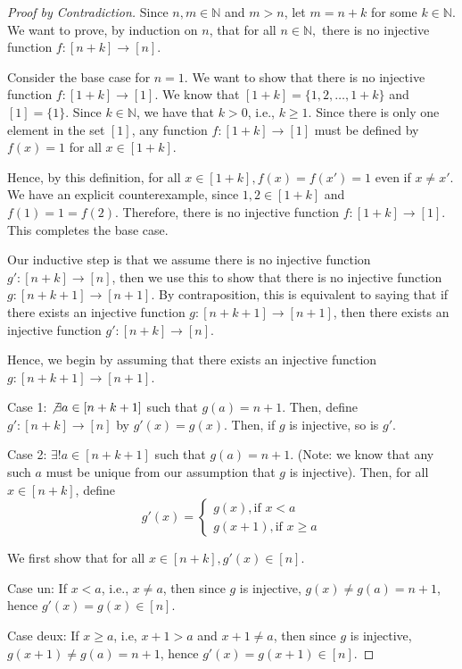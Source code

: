 \documentclass[11pt]{article}
\newcommand{\bbN}{\mathbb{N}}
\theoremstyle{definition}
\numberwithin{equation}{subsection}
\begin{document}
\begin{proof}[Proof by Contradiction]
Since $n, m \in \bbN$ and $m>n$, let $m=n+k$ for some $k \in \bbN$. We want to prove, by induction on $n$, that for all $n\in\mathbb{N},$ there is no injective function $f:[n+k]\rightarrow [n].$

Consider the base case for $n=1$. We want to show that there is no injective function $f:[1+k]\rightarrow [1].$ We know that $[1+k] = \{1, 2, \dots, 1+k\}$ and $[1] = \{1\}$. Since $k \in \bbN$, we have that $k>0$, i.e., $k \geq 1$. Since there is only one element in the set $[1]$, any function $f\colon [1+k] \rightarrow [1]$ must be defined by $f(x)=1$ for all $x \in [1+k]$. 

Hence, by this definition, for all $x \in [1+k], f(x)=f(x')=1$ even if $x \not = x'$. We have an explicit counterexample, since $1,2 \in [1+k]$ and $f(1)=1=f(2)$. Therefore, there is no injective function $f:[1+k]\rightarrow [1].$ This completes the base case.

Our inductive step is that we assume there is no injective function $g':[n+k]\rightarrow [n]$, then we use this to show that there is no injective function $g:[n+k+1]\rightarrow [n+1].$ By contraposition, this is equivalent to saying that if there exists an injective function $g:[n+k+1]\rightarrow [n+1]$, then there exists an injective function $g':[n+k]\rightarrow [n].$ 

Hence, we begin by assuming that there exists an injective function $g:[n+k+1]\rightarrow [n+1]$.

Case 1: $\not \exists a \in [n+k+1]$ such that $g(a)=n+1$. Then, define $g'\colon [n+k] \rightarrow [n]$ by $g'(x)=g(x)$. Then, if $g$ is injective, so is $g'$.

Case 2: $\exists! a \in [n+k+1]$ such that $g(a)=n+1$. (Note: we know that any such $a$ must be unique from our assumption that $g$ is injective). Then, for all $x \in [n+k]$, define 
\[
g'(x) =
\begin{cases}
g(x), \text{if } x < a \\
g(x+1), \text{if } x \geq a
\end{cases}
\]

We first show that for all $x \in [n+k], g'(x) \in [n]$. 

Case un: If $x < a$, i.e., $x \not= a$, then since $g$ is injective, $g(x) \not= g(a) = n+1$, hence $g'(x)=g(x) \in [n]$. 

Case deux: If $x \geq a$, i.e, $x+1 > a$ and $x+1 \not= a$, then since $g$ is injective, $g(x+1) \not= g(a) = n+1$, hence $g'(x)=g(x+1) \in [n]$.


\end{proof}
\end{document}
